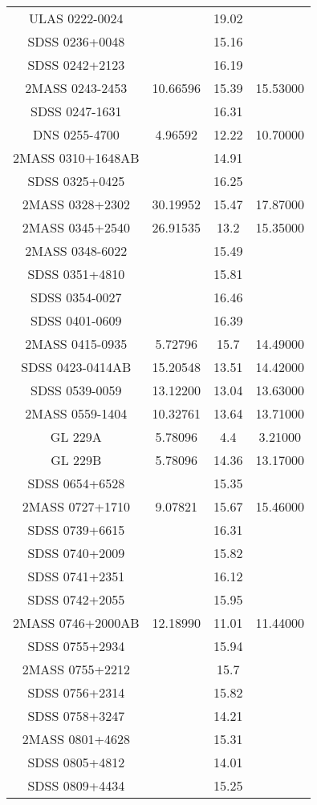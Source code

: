 \begin{table}
\begin{tabular}{cccc}
ULAS 0222-0024 &  & 19.02 &  \\
SDSS 0236+0048 &  & 15.16 &  \\
SDSS 0242+2123 &  & 16.19 &  \\
2MASS 0243-2453 & 10.66596 & 15.39 & 15.53000 \\
SDSS 0247-1631 &  & 16.31 &  \\
DNS 0255-4700 & 4.96592 & 12.22 & 10.70000 \\
2MASS 0310+1648AB &  & 14.91 &  \\
SDSS 0325+0425 &  & 16.25 &  \\
2MASS 0328+2302 & 30.19952 & 15.47 & 17.87000 \\
2MASS 0345+2540 & 26.91535 & 13.2 & 15.35000 \\
2MASS 0348-6022 &  & 15.49 &  \\
SDSS 0351+4810 &  & 15.81 &  \\
SDSS 0354-0027 &  & 16.46 &  \\
SDSS 0401-0609 &  & 16.39 &  \\
2MASS 0415-0935 & 5.72796 & 15.7 & 14.49000 \\
SDSS 0423-0414AB & 15.20548 & 13.51 & 14.42000 \\
SDSS 0539-0059 & 13.12200 & 13.04 & 13.63000 \\
2MASS 0559-1404 & 10.32761 & 13.64 & 13.71000 \\
GL 229A & 5.78096 & 4.4 & 3.21000 \\
GL 229B & 5.78096 & 14.36 & 13.17000 \\
SDSS 0654+6528 &  & 15.35 &  \\
2MASS 0727+1710 & 9.07821 & 15.67 & 15.46000 \\
SDSS 0739+6615 &  & 16.31 &  \\
SDSS 0740+2009 &  & 15.82 &  \\
SDSS 0741+2351 &  & 16.12 &  \\
SDSS 0742+2055 &  & 15.95 &  \\
2MASS 0746+2000AB & 12.18990 & 11.01 & 11.44000 \\
SDSS 0755+2934 &  & 15.94 &  \\
2MASS 0755+2212 &  & 15.7 &  \\
SDSS 0756+2314 &  & 15.82 &  \\
SDSS 0758+3247 &  & 14.21 &  \\
2MASS 0801+4628 &  & 15.31 &  \\
SDSS 0805+4812 &  & 14.01 &  \\
SDSS 0809+4434 &  & 15.25 &  \\

\end{tabular}
\end{table}
